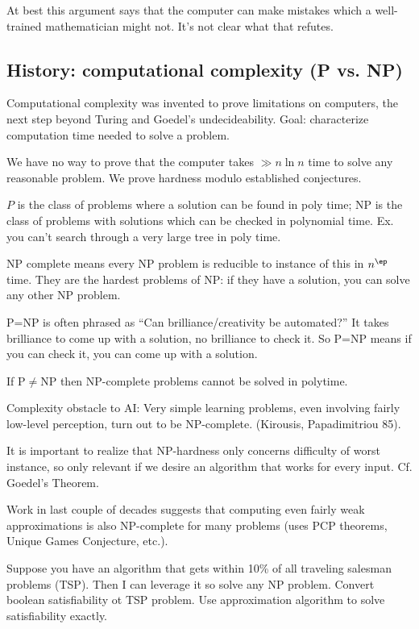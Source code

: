 At best this argument says that the computer can make mistakes which a well-trained mathematician might not. It's not clear what that refutes.

\subsection{History: computational complexity (P vs. NP)}

Computational complexity was invented to prove limitations on computers, the next step beyond Turing and Goedel's undecideability. Goal: characterize computation time needed to solve a problem. %

We have no way to prove that the computer takes $\gg n\ln n$ time to solve any reasonable problem. 
We prove hardness modulo established conjectures. 

$P$ is the class of problems where a solution can be found in poly time; NP is the class of problems  with solutions which can be checked in polynomial time. Ex. you can't search through a very large tree in poly time.

NP complete means every NP problem is reducible to instance of this in $n^\ep$ time. They are the hardest problems of NP: if they have a solution, you can solve any other NP problem.

P=NP is often phrased as ``Can brilliance/creativity be automated?'' It takes brilliance to come up with a solution, no brilliance to check it. So P=NP means if you can check it, you can come up with a solution. 

If P$\ne$NP then NP-complete problems cannot be solved in polytime.

Complexity obstacle to AI: Very simple learning problems, even involving fairly low-level perception, turn out to be NP-complete.  (Kirousis, Papadimitriou 85).

It is important to realize that NP-hardness only concerns difficulty of worst instance, so only relevant if we desire an algorithm that works for every input. Cf. Goedel's Theorem. 

Work in last couple of decades suggests that computing even fairly weak approximations is also NP-complete for many problems (uses PCP theorems, Unique Games Conjecture, etc.). 


Suppose you have an algorithm that gets within 10\% of all traveling salesman problems (TSP). Then I can leverage it so solve any NP problem. Convert boolean satisfiability ot TSP problem. Use approximation algorithm to solve satisfiability exactly.


